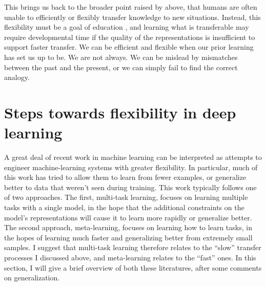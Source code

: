 This brings us back to the broader point raised by \citet{Detterman1993} above, that humans are often unable to efficiently or flexibly transfer knowledge to new situations. Instead, this flexibility must be a goal of education \citep{Bransford1999}, and learning what is transferable may require developmental time \citep{Lampinen2017a} if the quality of the representations is insufficient to support faster transfer. We can be efficient and flexible when our prior learning has set us up to be. We are not always. We can be mislead by mismatches between the past and the present, or we can simply fail to find the correct analogy.\par

\section{Steps towards flexibility in deep learning}

A great deal of recent work in machine learning can be interpreted as attempts to engineer machine-learning systems with greater flexibility. In particular, much of this work has tried to allow them to learn from fewer examples, or generalize better to data that weren't seen during training. This work typically follows one of two approaches. The first, multi-task learning, focuses on learning multiple tasks with a single model, in the hope that the additional constraints on the model's representations will cause it to learn more rapidly or generalize better. The second approach, meta-learning, focuses on learning how to learn tasks, in the hopes of learning much faster and generalizing better from extremely small samples. I suggest that multi-task learning therefore relates to the ``slow'' transfer processes I discussed above, and meta-learning relates to the ``fast'' ones. In this section, I will give a brief overview of both these literatures, after some comments on generalization. \par

